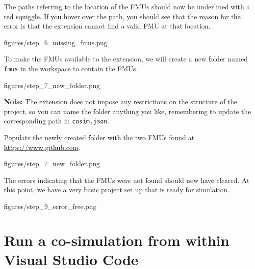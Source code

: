 \documentclass[11pt,a4paper]{../tutorial}
\begin{document}
\begin{instructions}
\item The paths referring to the location of the FMUs should now be underlined with a red squiggle. If you hover over the path, you should see that the reason for the error is that the extension cannot find a valid FMU at that location.
	
	\begin{annotation}[width=0.85\linewidth]{figures/step_6_missing_fmus.png}
	\end{annotation}

\item To make the FMUs available to the extension, we will create a new folder named \texttt{fmus} in the workspace to contain the FMUs.
	
	\begin{annotation}[width=0.85\linewidth]{figures/step_7_new_folder.png}
	\end{annotation}

	\bigskip
    \bigskip
    {\large\bfseries Note:} The extension does not impose any restrictions on the structure of the project, so you can name the folder anything you like, remembering to update the corresponding path in \texttt{cosim.json}.

\item Populate the newly created folder with the two FMUs found at \url{https://www.github.com}.
	
	\begin{annotation}[width=0.85\linewidth]{figures/step_7_new_folder.png}
	\end{annotation}

\item The errors indicating that the FMUs were not found should now have cleared. At this point, we have a very basic project set up that is ready for simulation.
	
	\begin{annotation}[width=0.85\linewidth]{figures/step_9_error_free.png}
	\end{annotation}

\end{instructions}

\newpage 

\section{Run a co-simulation from within Visual Studio Code}
\end{document}
